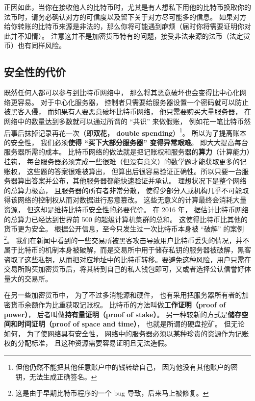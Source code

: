正因如此，当你在接收他人的比特币时，尤其是有人想私下用他的比特币换取你的法币时，请务必确认对方的可信度以及留下关于对方尽可能多的信息。 如果对方给你转账的比特币来源是非法的，那么你将可能遇到麻烦（届时你将需要证明你对此并不知情）。 注意这并不是加密货币特有的问题，接受非法来源的法币（法定货币）也有同样风险。

\subsection{安全性的代价}
既然任何人都可以参与到比特币网络中， 那么将其恶意破坏也会变得比中心化网络更容易。 对于中心化服务器， 控制者只需要给服务器设置一个密码就可以防止被黑客入侵， 而如果有人要恶意破坏比特币网络， 他只需要购买大量服务器， 在网络中的数量达到多数就可以通过所谓的 “共识” 来做假账， 例如花一笔比特币然后事后抹掉记录再花一次（即\textbf{双花， double spending}）\footnote{但他仍然不能把其他任意账户中的钱转给自己， 因为他没有其他账户的密钥，无法生成正确签名。}。 所以为了提高账本的安全性， 我们必须\textbf{使得 “买下大部分服务器” 变得异常艰难}。 即大大提高每台服务器所需的成本。 比特币网络的做法就是把记账权和服务器的\textbf{算力}（计算能力）挂钩， 每台服务器必须完成一些很难（但没有意义）的数学题才能获取更多的记账权， 这些题的答案很难被算出， 但算出后很容易验证正确性。所以只要一台服务器算出答案并公布，其他服务器都能快速验证并承认。 理想状况下是整个网络的总算力极高， 且服务器的所有者非常分散， 使得少部分人或机构几乎不可能取得该网络的控制权从而对数据进行恶意篡改。 这些无意义的计算最终会消耗大量资源， 但这却是维持比特币安全性的必要代价。 在 2016 年， 据估计比特币网络的总算力已经达到世界前 500 的超级计算机集群的总和。 这使得比特币比其他的货币更为安全。 根据公开信息，至今只发生过一次比特币本身被 “破解” 的案例\footnote{这是由于早期比特币程序的一个 bug 导致，后来马上被修复。}。 我们在新闻中看到的一些交易所被黑客攻击导致用户比特币丢失的情况，并不属于比特币的机制本身被破解，而是交易所中用于储存私钥的服务器被破解，黑客盗取了这些私钥，从而把对应地址中的比特币转移。要避免这种风险，用户只需在交易所购买加密货币后，将其转到自己的私人钱包即可，又或者选择公认信誉好体量大的交易所。

在另一些加密货币中， 为了不过多消能源和硬件， 也有采用把服务器所有者的加密货币余额作为比重获取记账权。 比特币的方法叫做\textbf{工作证明（proof of power）}， 后者叫做\textbf{持有量证明（proof of stake）}。 另一种较新的方式是\textbf{储存空间和时间证明（proof of space and time）}， 也就是所谓的硬盘挖矿。 但无论如何， 为了使网络具有安全性， 网络中的服务器必须以某种珍贵的资源作为记账权的分配标准， 且这种资源需要容易证明且无法造假。

